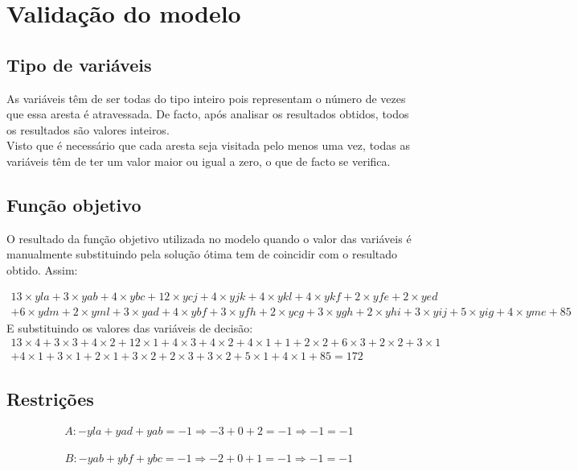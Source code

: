 \documentclass[a4paper]{report}
\begin{document}
\pagebreak
\section{Validação do modelo}
\subsection{Tipo de variáveis}
As variáveis têm de ser todas do tipo inteiro pois representam o número
de vezes que essa aresta é atravessada.
De facto, após analisar os resultados obtidos, todos os resultados são
valores inteiros.\\
Visto que é necessário que cada aresta seja visitada pelo menos uma
vez, todas as variáveis têm de ter um valor maior ou igual a zero, o
que de facto se verifica.

\subsection{Função objetivo}
O resultado da função objetivo utilizada no modelo quando o valor
das variáveis é manualmente substituindo pela solução ótima tem de 
coincidir com o resultado obtido.
Assim:

\begin{multline}
13\times yla + 3\times yab + 4\times ybc + 12\times ycj + 4\times
yjk + 4\times ykl + 4\times ykf + 2\times yfe + 2\times yed \\ + 6\times ydm +
2\times yml + 3\times yad + 4\times ybf + 3\times yfh + 2\times ycg +
3\times ygh + 2\times yhi + 3\times yij + 5\times yig + 4\times yme + 85
\end{multline}
E substituindo os valores das variáveis de decisão:
\begin{multline}
13\times 4 + 3\times 3 + 4\times 2 + 12\times 1 + 4\times
3 + 4\times 2 + 4\times 1 + 1 + 2\times 2 + 6\times 3 +
2\times 2 + 3\times 1 \\ + 4\times 1 + 3\times 1 + 2\times 1 +
3\times 2 + 2\times 3 + 3\times 2 + 5\times 1 + 4\times 1 + 85
= 172
\end{multline}

\subsection{Restrições}
\begin{multline}
A: - yla + yad + yab = -1
\Rightarrow - 3 + 0 + 2 = -1 
\Rightarrow -1 = -1
\end{multline}

\begin{multline}
B: - yab + ybf + ybc = -1
\Rightarrow - 2 + 0 + 1 = -1
\Rightarrow -1 = -1
\end{multline}
\end{document}
